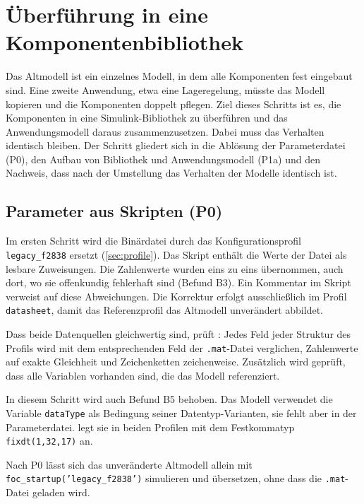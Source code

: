\chapter{Überführung in eine Komponentenbibliothek}
\label{ch:bibliothek}

Das Altmodell  ist ein einzelnes Modell, in dem alle
Komponenten fest eingebaut sind. Eine zweite Anwendung, etwa eine Lageregelung, müsste
das Modell kopieren und die Komponenten doppelt pflegen. Ziel dieses Schritts ist es, die
Komponenten in eine Simulink-Bibliothek zu überführen und das Anwendungsmodell daraus
zusammenzusetzen. Dabei muss das Verhalten identisch bleiben. Der Schritt gliedert sich in
die Ablösung der Parameterdatei (P0), den Aufbau von Bibliothek und Anwendungsmodell (P1a)
und den Nachweis, dass nach der Umstellung das Verhalten der Modelle identisch ist.

\section{Parameter aus Skripten (P0)}
\label{sec:p0}

Im ersten Schritt wird die Binärdatei  durch das
Konfigurationsprofil \texttt{legacy\_f2838} ersetzt (\cref{sec:profile}). Das Skript
 enthält die Werte der Datei als lesbare Zuweisungen. Die
Zahlenwerte wurden eins zu eins übernommen, auch dort, wo sie offenkundig
fehlerhaft sind (Befund B3). Ein Kommentar im Skript verweist auf diese Abweichungen. Die
Korrektur erfolgt ausschließlich im Profil \texttt{datasheet}, damit das Referenzprofil das
Altmodell unverändert abbildet.

Dass beide Datenquellen gleichwertig sind, prüft : Jedes Feld jeder
Struktur des Profils wird mit dem entsprechenden Feld der \texttt{.mat}-Datei verglichen,
Zahlenwerte auf exakte Gleichheit und Zeichenketten zeichenweise. Zusätzlich wird geprüft, dass
alle Variablen vorhanden sind, die das Modell referenziert.

In diesem Schritt wird auch Befund B5 behoben. Das Modell verwendet die Variable
\texttt{dataType} als Bedingung seiner Datentyp-Varianten, sie fehlt aber in der
Parameterdatei.  legt sie in beiden Profilen mit dem Festkommatyp
\texttt{fixdt(1,32,17)} an.

Nach P0 lässt sich das unveränderte Altmodell allein mit
\texttt{foc\_startup('legacy\_f2838')} simulieren und übersetzen, ohne dass die
\texttt{.mat}-Datei geladen wird.


